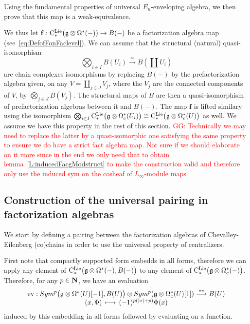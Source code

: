 \documentclass[11pt]{amsart}
\numberwithin{equation}{section}
\def\greg{\textcolor{red}{GG: }\textcolor{red}}
\begin{document}
Using the fundamental properties of universal $E_n$-enveloping algebra, we then prove that 
this map is a weak-equivalence. 

\smallskip 

We thus let $\mathbf{f}: {\rm C}^{\rm Lie}_*\big(\mathfrak g \otimes \Omega^* (-)) \to B(-)$ be a factorization algebra map (see~\eqref{eq:DefofFonFaclevel}). We can 
assume that the structural (natural) quasi-isomorphism
$$\bigotimes_{i\in I} B(U_i) 
\stackrel{\simeq}\longrightarrow B(\coprod  U_i)$$ are chain complexes isomorphisms by replacing $B(-)$ by the prefactorization algebra 
given, on any $V=\coprod_{j\in J} V_j$, where the $V_j$ are the connected components of $V$, by   $\mathop{\bigotimes}\limits_{j\in J} B(V_j)$. 
The structural maps of $B$ are then a quasi-isomorphism of prefactorization algebras between it and $B(-)$. The map $\mathbf{f}$ is lifted similary using 
the isomorphism $\bigotimes_{i\in I} {\rm C}^{\rm Lie}_*\big(\mathfrak g \otimes \Omega_c^* (U_i)\big) \cong
{\rm C}^{\rm Lie}_*\big(\mathfrak g \otimes \Omega_c^* (U)\big)$ as well. We assume we have this property in the rest of this section.
\greg{Technically we may need to replace the latter by a quasi-isomorphic one satisfying the same property to ensure we do have a strict fact algebra map. 
Not sure if we should elaborate on it more since in the end we only need that to obtain lemma~\ref{L:inducedFacgModstruct} to make the construction valid 
and therefore only use the induced sym on the cosheaf of $L_\infty$-module maps}
\subsection{Construction of the universal pairing in factorization algebras}\label{SS:constuctionthetaf}
We start by defining a pairing between the factorization algebras of Chevalley-Eilenberg (co)chains in order to use the universal property of centralizers.

\smallskip 

First note that compactly supported form embedds in all forms, therefore we can apply 
any element of ${\rm C}^{\rm Lie}_*\big(\mathfrak g \otimes \Omega^* (-), B(-)\big)$ 
to any element of ${\rm C}^{\rm Lie}_*\big(\mathfrak g \otimes \Omega_c^* (-)\big)$. Therefore, for any  $p\in \mathbf N$, we have an evaluation 
\begin{equation} \label{eqdef:ev} \begin{array}{c}{\rm ev}: Sym^p \big( \mathfrak g \otimes \Omega^* (U)[-1] ,B(U)\big)
\otimes  Sym^p( \mathfrak g\otimes \Omega^*_c(U) [1]) \stackrel{ev}\longrightarrow B(U)  
  \\
 (x,\Phi) \,\longmapsto\, (-1)^{p(|x|+p) } \Phi (x)\end{array}
\end{equation} induced by this embedding  in all forms followed by evaluating on a function.
\end{document}
